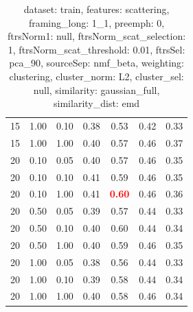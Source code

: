 \begin{table}
\begin{center}
\begin{tabular}{lllcccc}
15 & 1.00 & 0.10 & 0.38 & 0.53 & 0.42 & 0.33 \\ 
15 & 1.00 & 1.00 & 0.40 & 0.57 & 0.46 & 0.37 \\ 
20 & 0.10 & 0.05 & 0.40 & 0.57 & 0.46 & 0.35 \\ 
20 & 0.10 & 0.10 & 0.41 & 0.59 & 0.46 & 0.35 \\ 
20 & 0.10 & 1.00 & 0.41 & \textbf{\textcolor{red}{0.60}} & 0.46 & 0.36 \\ 
20 & 0.50 & 0.05 & 0.39 & 0.57 & 0.44 & 0.33 \\ 
20 & 0.50 & 0.10 & 0.40 & 0.60 & 0.44 & 0.34 \\ 
20 & 0.50 & 1.00 & 0.40 & 0.59 & 0.46 & 0.35 \\ 
20 & 1.00 & 0.05 & 0.38 & 0.56 & 0.44 & 0.33 \\ 
20 & 1.00 & 0.10 & 0.39 & 0.58 & 0.44 & 0.34 \\ 
20 & 1.00 & 1.00 & 0.40 & 0.58 & 0.46 & 0.34 \\ 
\end{tabular} 
\end{center} 
\caption{dataset: train, features: scattering, framing\_long: 1\_1, preemph: 0, ftrsNorm1: null, ftrsNorm\_scat\_selection: 1, ftrsNorm\_scat\_threshold: 0.01, ftrsSel: pca\_90, sourceSep: nmf\_beta, weighting: clustering, cluster\_norm: L2, cluster\_sel: null, similarity: gaussian\_full, similarity\_dist: emd} 
\label{datasetrFeaturscFraminlong1_1Preemp0Ftrsnorm1nuFtrsnoscatselect1Ftrsnoscatthresh0.01Ftrsselpc90SourcesepnmbeWeightclClustenormL2ClusteselnuSimilagafuSimiladistem} 
\end{table} 
 
